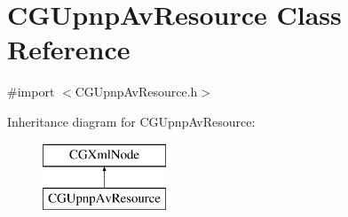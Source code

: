\hypertarget{interface_c_g_upnp_av_resource}{\section{C\-G\-Upnp\-Av\-Resource Class Reference}
\label{interface_c_g_upnp_av_resource}
}


{\ttfamily \#import $<$C\-G\-Upnp\-Av\-Resource.\-h$>$}

Inheritance diagram for C\-G\-Upnp\-Av\-Resource\-:\begin{figure}[H]
\begin{center}
\leavevmode
\includegraphics[height=2.000000cm]{interface_c_g_upnp_av_resource}
\end{center}
\end{figure}
